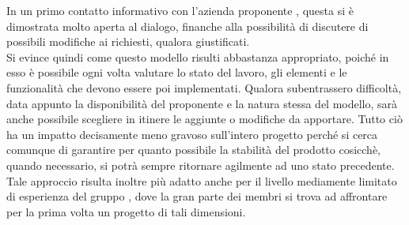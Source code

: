 In un primo contatto informativo con l'azienda proponente \proponente{}, questa si è dimostrata molto aperta al dialogo, finanche alla possibilità di discutere di possibili modifiche ai  richiesti, qualora giustificati.\\
Si evince quindi come questo modello risulti abbastanza appropriato, poiché in esso è possibile ogni volta valutare lo stato del lavoro, gli elementi e le funzionalità che devono essere poi implementati. Qualora subentrassero difficoltà, data appunto la disponibilità del proponente e la natura stessa del modello, sarà anche possibile scegliere in itinere le aggiunte o modifiche da apportare. Tutto ciò ha un impatto decisamente meno gravoso sull'intero progetto perché si cerca comunque di garantire per quanto possibile la stabilità del prodotto cosicchè, quando necessario, si potrà sempre ritornare agilmente ad uno stato precedente. \\
Tale approccio risulta inoltre più adatto anche per il livello mediamente limitato di esperienza del gruppo \Gruppo{}, dove la gran parte dei membri si trova ad affrontare per la prima volta un progetto di tali dimensioni.